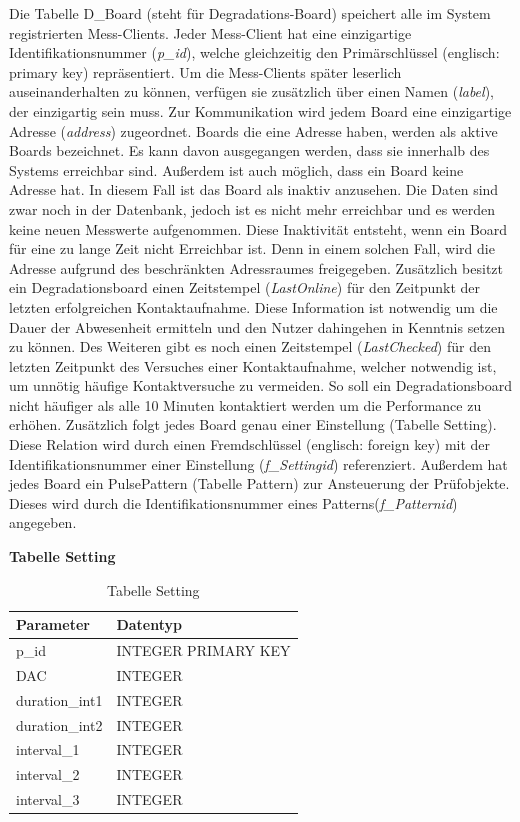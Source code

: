 Die Tabelle D\_Board (steht für Degradations-Board) speichert alle im System registrierten Mess-Clients. Jeder Mess-Client hat eine einzigartige Identifikationsnummer (\textit{p\_id}), welche gleichzeitig den Primärschlüssel (englisch: primary key) repräsentiert. Um die Mess-Clients später leserlich auseinanderhalten zu können, verfügen sie zusätzlich über einen Namen (\textit{label}), der einzigartig sein muss. Zur Kommunikation wird jedem Board eine einzigartige Adresse (\textit{address}) zugeordnet. Boards die eine Adresse haben, werden als aktive Boards bezeichnet. Es kann davon ausgegangen werden, dass sie innerhalb des Systems erreichbar sind. Außerdem ist auch möglich, dass ein Board keine Adresse hat. In diesem Fall ist das Board als inaktiv anzusehen. Die Daten sind zwar noch in der Datenbank, jedoch ist es nicht mehr erreichbar und es werden keine neuen Messwerte aufgenommen. Diese Inaktivität entsteht, wenn ein Board für eine zu lange Zeit nicht Erreichbar ist. Denn in einem solchen Fall, wird die Adresse aufgrund des beschränkten Adressraumes freigegeben. Zusätzlich besitzt ein Degradationsboard einen Zeitstempel (\textit{LastOnline}) für den Zeitpunkt der letzten erfolgreichen Kontaktaufnahme. Diese Information ist notwendig um die Dauer der Abwesenheit ermitteln und den Nutzer dahingehen in Kenntnis setzen zu können. Des Weiteren gibt es noch einen Zeitstempel (\textit{LastChecked}) für den letzten Zeitpunkt des Versuches einer Kontaktaufnahme, welcher notwendig ist, um unnötig häufige Kontaktversuche zu vermeiden. So soll ein Degradationsboard nicht häufiger als alle 10 Minuten kontaktiert werden um die Performance zu erhöhen. Zusätzlich folgt jedes Board genau einer Einstellung (Tabelle Setting). Diese Relation wird durch einen Fremdschlüssel (englisch: foreign key) mit der Identifikationsnummer einer Einstellung (\textit{f\_Settingid}) referenziert. Außerdem hat jedes Board ein PulsePattern (Tabelle Pattern) zur Ansteuerung der Prüfobjekte. Dieses wird durch die Identifikationsnummer eines Patterns(\textit{f\_Patternid}) angegeben.


\newpage

\textbf{Tabelle Setting}\\

\begin{table}[H]
\begin{center}
\begin{tabular}{|l|l|}\hline
Parameter & Datentyp \\ \hline
p\_id & INTEGER PRIMARY KEY\\ 
DAC & INTEGER\\ 
duration\_int1 & INTEGER\\ 
duration\_int2 & INTEGER\\ 
interval\_1 & INTEGER\\ 
interval\_2 & INTEGER\\ 
interval\_3 & INTEGER\\ \hline
\end{tabular}
\caption{Tabelle Setting}
\label{table_TabelleSetting}
\end{center}
\end{table}


